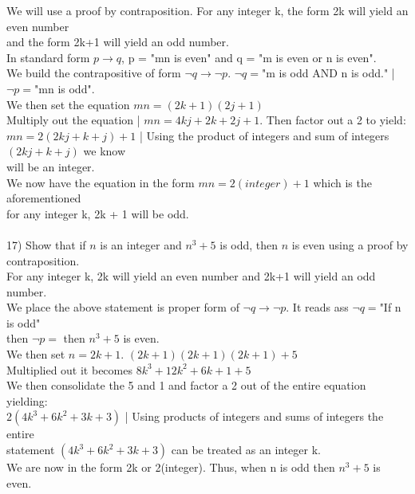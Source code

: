 \documentclass{article}
\begin{document}
\begin{flushleft}
\setlength\parindent{24pt}We will use a proof by contraposition.  For any integer k, the form 2k will yield an even number \\
and the form 2k+1 will yield an odd number.\\
\setlength\parindent{24pt} In standard form $p \rightarrow q$, p = "mn is even" and q = "m is even or n is even".\\
\setlength\parindent{24pt} We build the contrapositive of form $\neg q \rightarrow \neg p$.  $\neg q = $"m is odd AND n is odd." | $\neg p = $"mn is odd". \\ 
\setlength\parindent{24pt}We then set the equation $mn = (2k+1)(2j+1)$\\
\setlength\parindent{24pt}Multiply out the equation | $mn = 4kj + 2k + 2j + 1$.  Then factor out a 2 to yield:\\
\setlength\parindent{24pt}$mn = 2( 2kj + k + j ) + 1$ | Using the product of integers and sum of integers $( 2kj + k + j )$ we know \\
will be an integer. \\
\setlength\parindent{24pt} We now have the equation in the form $mn = 2(integer) + 1$ which is the aforementioned \\
for any integer k, 2k + 1 will be odd. \\
~\\
\setlength\parindent{0pt}17) Show that if $n$ is an integer and $n^3 + 5$ is odd, then $n$ is even using a proof by contraposition.\\
\setlength\parindent{24pt} For any integer k, 2k will yield an even number and 2k+1 will yield an odd number.\\
\setlength\parindent{24pt} We place the above statement is proper form of $\neg q \rightarrow \neg p$.  It reads ass $\neg q = $"If n is odd" \\
then $\neg p = $ then $n^3 + 5 $ is even.\\
\setlength\parindent{24pt} We then set $n = 2k + 1$.  $(2k + 1)(2k + 1)(2k + 1) + 5$\\
\setlength\parindent{24pt} Multiplied out it becomes $8k^3 + 12k^2 + 6k + 1 + 5$\\
\setlength\parindent{24pt} We then consolidate the 5 and 1 and factor a 2 out of the entire equation yielding:\\
\setlength\parindent{24pt} $2(4k^3 + 6k^2 + 3k + 3)$ | Using products of integers and sums of integers the entire \\
statement $(4k^3 + 6k^2 + 3k + 3)$ can be treated as an integer k. \\
\setlength\parindent{24pt} We are now in the form 2k or 2(integer).  Thus, when n is odd then $n^3 + 5$ is even.



\end{flushleft}
\end{document}
